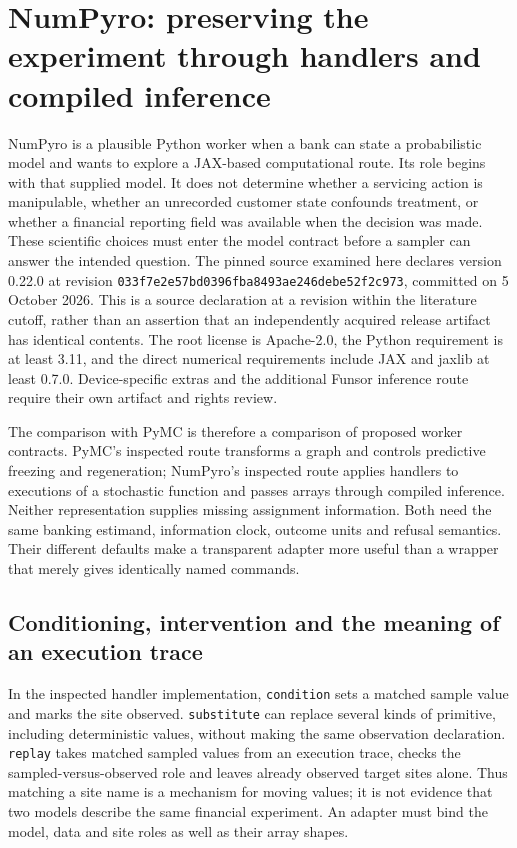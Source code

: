 \section{NumPyro: preserving the experiment through handlers and compiled inference}
\label{sec:exec23-numpyro-worker}

NumPyro is a plausible Python worker when a bank can state a probabilistic model and wants to explore a JAX-based computational route. Its role begins with that supplied model. It does not determine whether a servicing action is manipulable, whether an unrecorded customer state confounds treatment, or whether a financial reporting field was available when the decision was made. These scientific choices must enter the model contract before a sampler can answer the intended question. The pinned source examined here declares version 0.22.0 at revision \texttt{033f7e2e57bd0396fba8493ae246debe52f2c973}, committed on 5 October 2026. This is a source declaration at a revision within the literature cutoff, rather than an assertion that an independently acquired release artifact has identical contents. The root license is Apache-2.0, the Python requirement is at least 3.11, and the direct numerical requirements include JAX and jaxlib at least 0.7.0. Device-specific extras and the additional Funsor inference route require their own artifact and rights review. \citep{exec23_numpyro_sources}

The comparison with PyMC is therefore a comparison of proposed worker contracts. PyMC's inspected route transforms a graph and controls predictive freezing and regeneration; NumPyro's inspected route applies handlers to executions of a stochastic function and passes arrays through compiled inference. Neither representation supplies missing assignment information. Both need the same banking estimand, information clock, outcome units and refusal semantics. Their different defaults make a transparent adapter more useful than a wrapper that merely gives identically named commands. \citep{exec23_pymc_sources,exec23_numpyro_sources}

\subsection{Conditioning, intervention and the meaning of an execution trace}

In the inspected handler implementation, \texttt{condition} sets a matched sample value and marks the site observed. \texttt{substitute} can replace several kinds of primitive, including deterministic values, without making the same observation declaration. \texttt{replay} takes matched sampled values from an execution trace, checks the sampled-versus-observed role and leaves already observed target sites alone. Thus matching a site name is a mechanism for moving values; it is not evidence that two models describe the same financial experiment. An adapter must bind the model, data and site roles as well as their array shapes. \citep{exec23_numpyro_sources}

